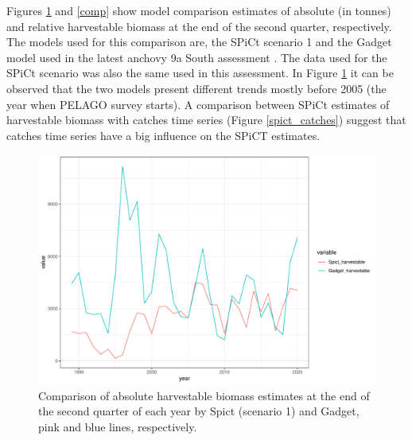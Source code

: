 \documentclass[review]{elsarticle}
\begin{document}
Figures \ref{comp_abs} and \ref{comp} show model comparison estimates of absolute (in tonnes) and relative harvestable biomass at the end of the second quarter, respectively. The models used for this comparison are, the SPiCt scenario 1  and the Gadget model used in the latest anchovy 9a South assessment \citep{Rincon20}. The data used for the SPiCt scenario was also the same used in this assessment. In Figure \ref{comp_abs} it can be observed that the two models present different trends mostly before 2005 (the year when PELAGO survey starts). A comparison between SPiCt estimates of harvestable biomass with catches time series (Figure \ref{spict_catches}) suggest that catches time series have a big influence on the SPiCT estimates.
\begin{figure}[h!]
 \centering
 \includegraphics[]{./comparison_abs.pdf}
 \caption{Comparison of absolute harvestable biomass estimates at the end of the second quarter of each year by Spict (scenario 1) and Gadget, pink and blue lines, respectively.}
 \label{comp_abs}
\end{figure}
\end{document}

